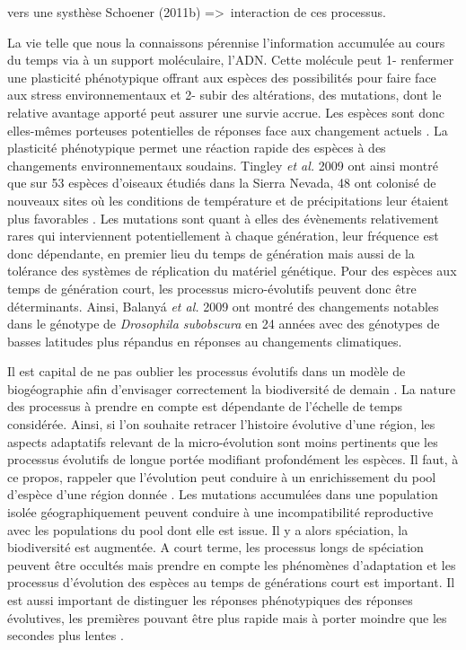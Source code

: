 vers une systhèse Schoener (2011b) =\textgreater{}~interaction de ces
processus.

La vie telle que nous la connaissons pérennise l'information accumulée
au cours du temps via à un support moléculaire, l'ADN. Cette molécule
peut 1- renfermer une plasticité phénotypique offrant aux espèces des
possibilités pour faire face aux stress environnementaux et 2- subir des
altérations, des mutations, dont le relative avantage apporté peut
assurer une survie accrue. Les espèces sont donc elles-mêmes porteuses
potentielles de réponses face aux changement actuels
\cite{Parmesan2006,Lavergne2010}. La plasticité phénotypique permet une
réaction rapide des espèces à des changements environnementaux soudains.
Tingley \textit{et al.} 2009 ont ainsi montré que sur 53 espèces
d'oiseaux étudiés dans la Sierra Nevada, 48 ont colonisé de nouveaux
sites où les conditions de température et de précipitations leur étaient
plus favorables \cite{Tingley2009}. Les mutations sont quant à elles des
évènements relativement rares qui interviennent potentiellement à chaque
génération, leur fréquence est donc dépendante, en premier lieu du temps
de génération mais aussi de la tolérance des systèmes de réplication du
matériel génétique. Pour des espèces aux temps de génération court, les
processus micro-évolutifs peuvent donc être déterminants. Ainsi, Balanyá
\textit{et al.} 2009 ont montré des changements notables dans le
génotype de \textit{Drosophila subobscura} en 24 années avec des
génotypes de basses latitudes plus répandus en réponses au changements
climatiques.

Il est capital de ne pas oublier les processus évolutifs dans un modèle
de biogéographie afin d'envisager correctement la biodiversité de demain
\cite{Sexton2009,Lavergne2010}. La nature des processus à prendre en
compte est dépendante de l'échelle de temps considérée. Ainsi, si l'on
souhaite retracer l'histoire évolutive d'une région, les aspects
adaptatifs relevant de la micro-évolution sont moins pertinents que les
processus évolutifs de longue portée modifiant profondément les espèces.
Il faut, à ce propos, rappeler que l'évolution peut conduire à un
enrichissement du pool d'espèce d'une région donnée
\cite{Rosindell2011,MacArthur1967}. Les mutations accumulées dans une
population isolée géographiquement peuvent conduire à une
incompatibilité reproductive avec les populations du pool dont elle est
issue. Il y a alors spéciation, la biodiversité est augmentée. A court
terme, les processus longs de spéciation peuvent être occultés mais
prendre en compte les phénomènes d'adaptation et les processus
d'évolution des espèces au temps de générations court est important. Il
est aussi important de distinguer les réponses phénotypiques des
réponses évolutives, les premières pouvant être plus rapide mais à
porter moindre que les secondes plus lentes \cite{Gienapp2008}.

